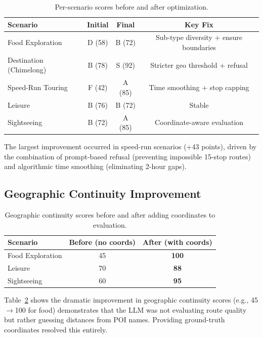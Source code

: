 \begin{table}[H]
\centering
\caption{Per-scenario scores before and after optimization.}
\label{tab:scenario_changes}
\begin{tabular}{@{}lccc@{}}
\toprule
\textbf{Scenario} & \textbf{Initial} & \textbf{Final} & \textbf{Key Fix} \\
\midrule
Food Exploration & D (58) & B (72) & Sub-type diversity + ensure boundaries \\
Destination (Chimelong) & B (78) & S (92) & Stricter geo threshold + refusal \\
Speed-Run Touring & F (42) & A (85) & Time smoothing + stop capping \\
Leisure & B (76) & B (72) & Stable \\
Sightseeing & B (72) & A (85) & Coordinate-aware evaluation \\
\bottomrule
\end{tabular}
\end{table}

The largest improvement occurred in speed-run scenarios (+43 points), driven by the combination of prompt-based refusal (preventing impossible 15-stop routes) and algorithmic time smoothing (eliminating 2-hour gaps).

\subsection{Geographic Continuity Improvement}

\begin{table}[H]
\centering
\caption{Geographic continuity scores before and after adding coordinates to evaluation.}
\label{tab:geo_improvement}
\begin{tabular}{@{}lcc@{}}
\toprule
\textbf{Scenario} & \textbf{Before (no coords)} & \textbf{After (with coords)} \\
\midrule
Food Exploration & 45 & \textbf{100} \\
Leisure & 70 & \textbf{88} \\
Sightseeing & 60 & \textbf{95} \\
\bottomrule
\end{tabular}
\end{table}

Table~\ref{tab:geo_improvement} shows the dramatic improvement in geographic continuity scores (e.g., 45$\rightarrow$100 for food) demonstrates that the LLM was not evaluating route quality but rather guessing distances from POI names. Providing ground-truth coordinates resolved this entirely.

